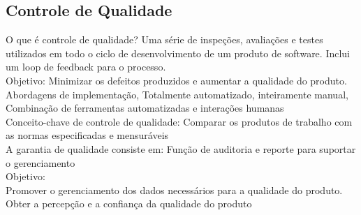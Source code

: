 \documentclass[12pt]{article}
\begin{document}
       \subsection{ Controle de Qualidade }
        O que é controle de qualidade? Uma série de inspeções, avaliações e testes utilizados em todo o ciclo de desenvolvimento de um produto de software. Inclui um loop de feedback para o processo.\\
        Objetivo: Minimizar os defeitos produzidos e aumentar a qualidade do produto. \\
        Abordagens de implementação, Totalmente automatizado, inteiramente manual, Combinação de ferramentas automatizadas e interações humanas \\
        Conceito-chave de controle de qualidade: Comparar os produtos de trabalho com as normas especificadas e mensuráveis \\
        A garantia de qualidade consiste em: Função de auditoria e reporte para suportar o gerenciamento \\
        Objetivo: \\
        Promover o gerenciamento dos dados necessários para a qualidade do produto. 
        Obter a percepção e a confiança da qualidade do produto \\
\end{document}
